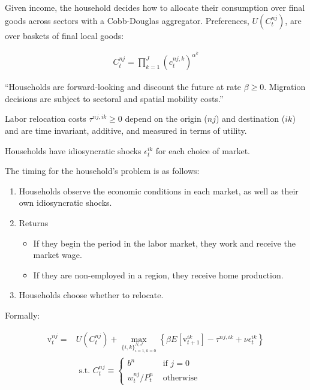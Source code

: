 \documentclass[10pt]{article}
\begin{document}
Given income, the household decides how to allocate 
their consumption over final goods across sectors 
with a Cobb-Douglas aggregator. Preferences,
$U\left(C_t^{n j}\right)$, are over 
baskets of final local goods:

\begin{align}
    C_t^{n j}=\prod_{k=1}^J\left(c_t^{n j, k}\right)^{\alpha^k}
\end{align}

``Households are forward-looking 
and discount the future at rate $\beta \geq 0$.
Migration decisions are subject to sectoral and spatial 
mobility costs.''

\begin{notes}[Assumption 1]
    Labor relocation costs $\tau^{n j, i k} \geq 0$ depend on the origin ($n j$) and destination ($ik$) and are time invariant, additive, and measured in terms of utility.
\end{notes}

Households have idiosyncratic shocks $\epsilon_t^{i k}$ for each choice of market.


The timing for the household's problem is as follows:

\begin{enumerate}
    \item Households observe the economic conditions in each market, as well 
        as their own idiosyncratic shocks.
    \item Returns
        \begin{itemize}
            \item If they begin the period in the labor market, they work 
            and receive the market wage.
            \item  If they are non-employed in a region, they receive 
                home production.
        \end{itemize}
    \item Households choose whether to relocate.
\end{enumerate}

Formally:

\begin{align}
    \mathrm{v}_t^{n j}=&U\left(C_t^{n j}\right)+\max _{\{i, k\}_{i=1, k=0}^{N, J}}\left\{\beta E\left[\mathrm{v}_{t+1}^{i k}\right]-\tau^{n j, i k}+\nu \epsilon_t^{i k}\right\} \\
    & \text { s.t. } C_t^{n j} \equiv \begin{cases}b^n & \text { if } j=0 \\
    w_t^{n j} / P_t^n & \text { otherwise }\end{cases}
\end{align}
\end{document}
